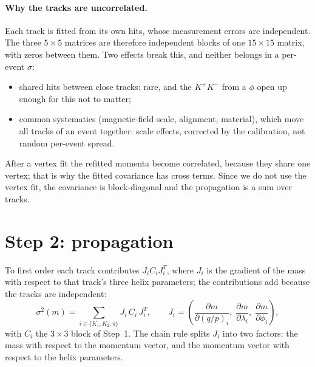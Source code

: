 \documentclass[11pt,a4paper]{article}
\newcommand{\qp}{(q/p)}
\begin{document}
\paragraph{Why the tracks are uncorrelated.} Each track is fitted from its own hits, whose measurement
errors are independent. The three $5\times5$ matrices are therefore independent blocks of one
$15\times15$ matrix, with zeros between them. Two effects break this, and neither belongs in a per-event
$\sigma$:
\begin{itemize}
  \item shared hits between close tracks: rare, and the $K^+K^-$ from a $\phi$ open up enough for this not
        to matter;
  \item common systematics (magnetic-field scale, alignment, material), which move all tracks of an event
        together: scale effects, corrected by the calibration, not random per-event spread.
\end{itemize}
After a vertex fit the refitted momenta become correlated, because they share one vertex; that is why the
fitted covariance has cross terms. Since we do not use the vertex fit, the covariance is block-diagonal and
the propagation is a sum over tracks.

\section{Step 2: propagation}

To first order each track contributes $J_i C_i J_i^T$, where $J_i$ is the gradient of the mass with
respect to that track's three helix parameters; the contributions add because the tracks are independent:
\begin{equation}
  \sigma^2(m) = \sum_{i\in\{K_1,K_2,\pi\}} J_i\, C_i\, J_i^{T}, \qquad
  J_i = \left( \frac{\partial m}{\partial \qp_i},\; \frac{\partial m}{\partial \lambda_i},\;
               \frac{\partial m}{\partial \phi_i} \right),
  \label{eq:prop}
\end{equation}
with $C_i$ the $3\times3$ block of Step~1. The chain rule splits $J_i$ into two factors: the mass with
respect to the momentum vector, and the momentum vector with respect to the helix parameters.
\end{document}
